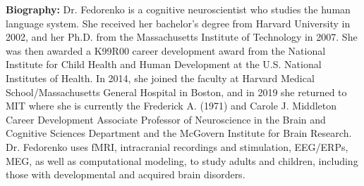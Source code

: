\vspace{3em}\par 

\vfill
\noindent

{\bfseries Biography:} 
Dr. Fedorenko is a cognitive neuroscientist who studies the human language system. She received her bachelor's degree from Harvard University in 2002, and her Ph.D. from the Massachusetts Institute of Technology in 2007. She was then awarded a K99R00 career development award from the National Institute for Child Health and Human Development at the U.S. National Institutes of Health. In 2014, she joined the faculty at Harvard Medical School/Massachusetts General Hospital in Boston, and in 2019 she returned to MIT where she is currently the Frederick A. (1971) and Carole J. Middleton Career Development Associate Professor of Neuroscience in the Brain and Cognitive Sciences Department and the McGovern Institute for Brain Research. Dr. Fedorenko uses fMRI, intracranial recordings and stimulation, EEG/ERPs, MEG, as well as computational modeling, to study adults and children, including those with developmental and acquired brain disorders.

\newpage
